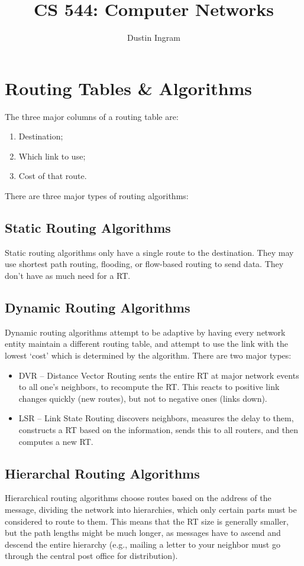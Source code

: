 \documentclass{article}
\title{CS 544: Computer Networks \\ }
\author{Dustin Ingram}
\begin{document}
\maketitle
\section{Routing Tables \& Algorithms}
The three major columns of a routing table are:
\begin{enumerate}
    \item Destination;
    \item Which link to use;
    \item Cost of that route.
\end{enumerate}
There are three major types of routing algorithms:
\subsection{Static Routing Algorithms}
Static routing algorithms only have a single route to the destination. They may use shortest path routing, flooding, or flow-based routing to send data. They don't have as much need for a RT.
\subsection{Dynamic Routing Algorithms}
Dynamic routing algorithms attempt to be adaptive by having every network entity maintain a different routing table, and attempt to use the link with the lowest `cost' which is determined by the algorithm. There are two major types:
\begin{itemize}
    \item DVR -- Distance Vector Routing sents the entire RT at major network events to all one's neighbors, to recompute the RT. This reacts to positive link changes quickly (new routes), but not to negative ones (links down).
    \item LSR -- Link State Routing discovers neighbors, measures the delay to them, constructs a RT based on the information, sends this to all routers, and then computes a new RT. 
\end{itemize}
\subsection{Hierarchal Routing Algorithms}
Hierarchical routing algorithms choose routes based on the address of the message, dividing the network into hierarchies, which only certain parts must be considered to route to them. This means that the RT size is generally smaller, but the path lengths might be much longer, as messages have to ascend and descend the entire hierarchy (e.g., mailing a letter to your neighbor must go through the central post office for distribution).
\end{document}
